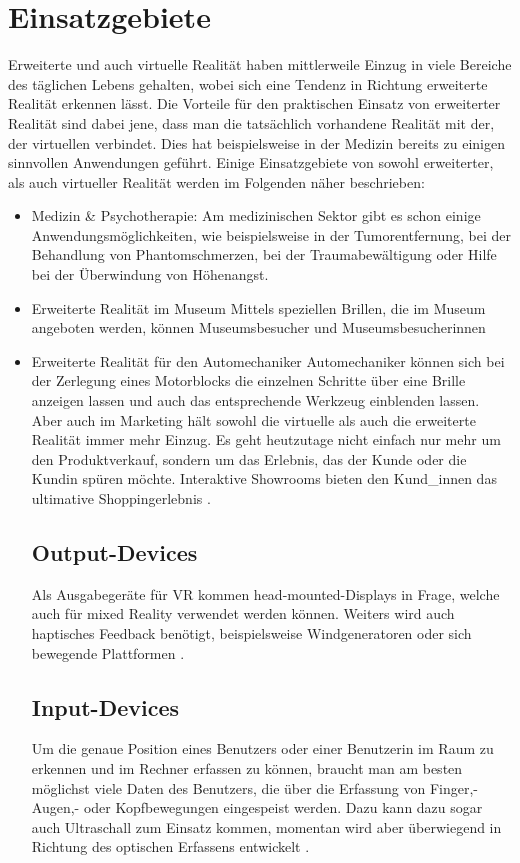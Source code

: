 \documentclass[deutsch]{llncs}
\begin{document}
\section{Einsatzgebiete}
Erweiterte und auch virtuelle Realität haben mittlerweile Einzug in viele Bereiche des täglichen Lebens gehalten, wobei sich eine Tendenz in Richtung erweiterte Realität erkennen lässt. Die Vorteile für den praktischen Einsatz von erweiterter Realität sind dabei jene, dass man die tatsächlich vorhandene Realität mit der, der virtuellen verbindet. Dies hat beispielsweise in der Medizin bereits zu einigen sinnvollen Anwendungen geführt. Einige Einsatzgebiete von sowohl erweiterter, als auch virtueller Realität werden im Folgenden näher beschrieben: 
\begin{itemize}
\item Medizin \& Psychotherapie:
Am medizinischen Sektor gibt es schon einige Anwendungsmöglichkeiten, wie beispielsweise in der Tumorentfernung, bei der Behandlung von Phantomschmerzen, bei der Traumabewältigung oder Hilfe bei der Überwindung von Höhenangst. 

\item Erweiterte Realität im Museum
Mittels speziellen Brillen, die im Museum angeboten werden, können Museumsbesucher und Museumsbesucherinnen 
\item Erweiterte Realität für den Automechaniker
Automechaniker können sich bei der Zerlegung eines Motorblocks die einzelnen Schritte über eine Brille anzeigen lassen und auch das entsprechende Werkzeug einblenden lassen. \\
Aber auch im Marketing hält sowohl die virtuelle als auch die erweiterte Realität immer mehr Einzug. Es geht heutzutage nicht einfach nur mehr um den Produktverkauf, sondern um das Erlebnis, das der Kunde oder die Kundin spüren möchte. Interaktive Showrooms bieten den Kund\_innen das ultimative Shoppingerlebnis \cite{}.

\subsection{Output-Devices}
Als Ausgabegeräte für VR kommen head-mounted-Displays in Frage, welche auch für mixed Reality verwendet werden können. Weiters wird auch haptisches Feedback benötigt, beispielsweise Windgeneratoren oder sich bewegende Plattformen \cite{Klampfer}.
\subsection{Input-Devices}
Um die genaue Position eines Benutzers oder einer Benutzerin im Raum zu erkennen und im Rechner erfassen zu können, braucht man am besten möglichst viele Daten des Benutzers, die über die Erfassung von Finger,- Augen,- oder Kopfbewegungen eingespeist werden. Dazu kann dazu sogar auch Ultraschall zum Einsatz kommen, momentan wird aber überwiegend in Richtung des optischen Erfassens entwickelt \cite{Klampfer}. 

\end{itemize}
\end{document}
